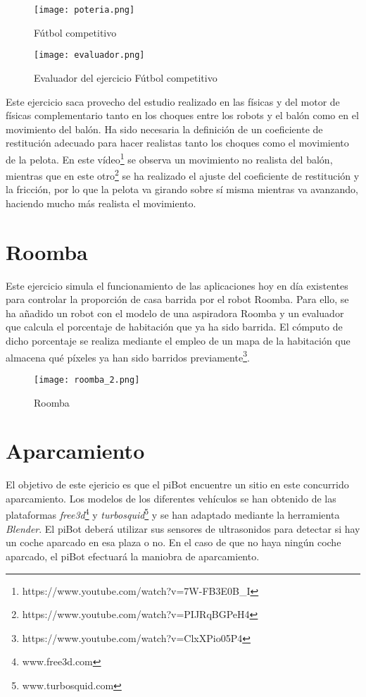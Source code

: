 \begin{figure}[h!]
    \centering
    \texttt{[image: poteria.png]}
    \caption{Fútbol competitivo}
    \label{fig:futbol}
\end{figure}

\begin{figure}[h!]
    \centering
    \texttt{[image: evaluador.png]}
    \caption{Evaluador del ejercicio Fútbol competitivo}
    \label{fig:futbol}
\end{figure}

Este ejercicio saca provecho del estudio realizado en las físicas y del motor de físicas complementario tanto en los choques entre los robots y el balón como en el movimiento del balón. Ha sido necesaria la definición de un coeficiente de restitución adecuado para hacer realistas tanto los choques como el movimiento de la pelota. En este vídeo\footnote{https://www.youtube.com/watch?v=7W-FB3E0B_I} se observa un movimiento no realista del balón, mientras que en este otro\footnote{https://www.youtube.com/watch?v=PIJRqBGPeH4} se ha realizado el ajuste del coeficiente de restitución y la fricción, por lo que la pelota va girando sobre sí misma mientras va avanzando, haciendo mucho más realista el movimiento.

\section{Roomba}
Este ejercicio simula el funcionamiento de las aplicaciones hoy en día existentes para controlar la proporción de casa barrida por el robot Roomba. Para ello, se ha añadido un robot con el modelo de una aspiradora Roomba y un evaluador que calcula el porcentaje de habitación que ya ha sido barrida. El cómputo de dicho porcentaje se realiza mediante el empleo de un mapa de la habitación que almacena qué píxeles ya han sido barridos previamente\footnote{https://www.youtube.com/watch?v=ClxXPio05P4}.

\begin{figure}[h!]
    \centering
    \texttt{[image: roomba\_2.png]}
    \caption{Roomba}
    \label{fig:roomba}
\end{figure}

\section{Aparcamiento}
El objetivo de este ejericio es que el piBot encuentre un sitio en este concurrido aparcamiento. Los modelos de los diferentes vehículos se han obtenido de las plataformas \textit{free3d}\footnote{www.free3d.com} y \textit{turbosquid}\footnote{www.turbosquid.com} y se han adaptado mediante la herramienta \textit{Blender}. El piBot deberá utilizar sus sensores de ultrasonidos para detectar si hay un coche aparcado en esa plaza o no. En el caso de que no haya ningún coche aparcado, el piBot efectuará la maniobra de aparcamiento.


